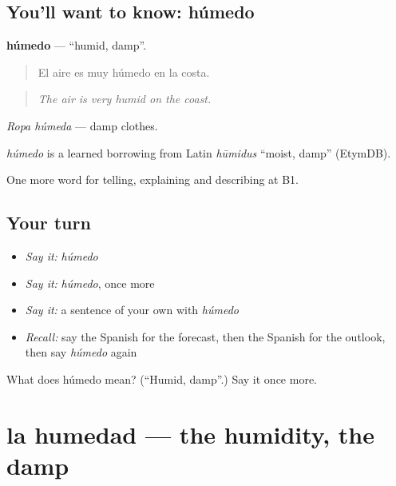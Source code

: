 \subsection*{You'll want to know: húmedo}
\textbf{húmedo} — \textquotedblleft{}humid, damp\textquotedblright{}.

\begin{quote}
El aire es muy húmedo en la costa.
\end{quote}

\begin{quote}
\emph{The air is very humid on the coast.}
\end{quote}

\emph{Ropa húmeda} — damp clothes.

\begin{cousinweb}
\emph{húmedo} is a learned borrowing from Latin \emph{hūmidus} \textquotedblleft{}moist, damp\textquotedblright{} (EtymDB).
\end{cousinweb}

\begin{grammarlens}[title={What you've built}]
One more word for telling, explaining and describing at B1.
\end{grammarlens}

\subsection*{Your turn}
\begin{itemize}
\raggedright
  \item \emph{Say it:} \emph{húmedo}
  \item \emph{Say it:} \emph{húmedo}, once more
  \item \emph{Say it:} a sentence of your own with \emph{húmedo}
  \item \emph{Recall:} say the Spanish for the forecast, then the Spanish for the outlook, then say \emph{húmedo} again
\end{itemize}

\begin{tcolorbox}[breakable,colback=teal!4,colframe=teal!35!black,title={Before you move on}]
What does húmedo mean? (\textquotedblleft{}Humid, damp\textquotedblright{}.) Say it once more.
\end{tcolorbox}
\section[la humedad]{la humedad — the humidity, the damp}

